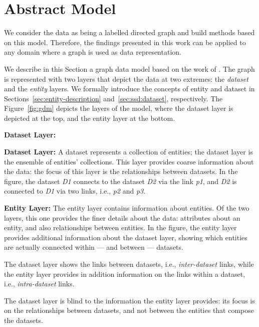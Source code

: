 \section{Abstract Model}
\label{chap2:semi-structured-data:gdm:abstract-model}

We consider the data as being a labelled directed graph and build methods based on this model. Therefore, the findings presented in this work can be applied to any domain where a graph is used as data representation.

We describe in this Section a graph data model based on the work of \cite{delbru:jws:entity}. The graph is represented with two layers that depict the data at two extremes: the \emph{dataset} and the \emph{entity} layers. We formally introduce the concepts of entity and dataset in Sections~\ref{sec:entity-description} and~\ref{sec:ssd:dataset}, respectively. The Figure~\ref{fig:gdm} depicts the layers of the model, where the dataset layer is depicted at the top, and the entity layer at the bottom.
\begin{labeling}{\textbf{Dataset Layer:}}
	\item[\textbf{Dataset Layer:}] A dataset represents a collection of entities; the dataset layer is the ensemble of entities' collections. This layer provides coarse information about the data: the focus of this layer is the relationships between datasets. In the figure, the dataset \emph{D1} connects to the dataset \emph{D2} via the link \emph{p1}, and \emph{D2} is connected to \emph{D1} via two links, i.e., \emph{p2} and \emph{p3}.
	\item[\textbf{Entity Layer:}] The entity layer contains information about entities. Of the two layers, this one provides the finer details about the data: attributes about an entity, and also relationships between entities. In the figure, the entity layer provides additional information about the dataset layer, showing which entities are actually connected within --- and between --- datasets.
\end{labeling}

The dataset layer shows the links between datasets, i.e., \emph{inter-dataset} links, while the entity layer provides in addition information on the links within a dataset, i.e., \emph{intra-dataset} links.

The dataset layer is blind to the information the entity layer provides: its focus is on the relationships between datasets, and not between the entities that compose the datasets.

